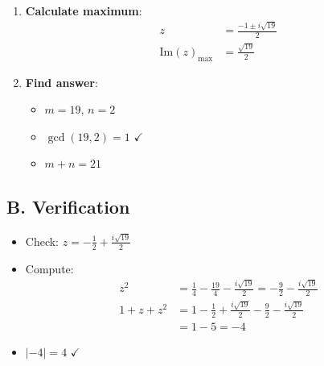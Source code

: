 \documentclass[11pt]{article}
\begin{document}
\begin{solutionbox}
\begin{enumerate}[leftmargin=*]
    \item \textbf{Calculate maximum}:
    \begin{align*}
    z &= \frac{-1 \pm i\sqrt{19}}{2}\\
    \text{Im}(z)_{\max} &= \frac{\sqrt{19}}{2}
    \end{align*}
    
    \item \textbf{Find answer}:
    \begin{itemize}
        \item $m = 19$, $n = 2$
        \item $\gcd(19, 2) = 1$ $\checkmark$
        \item $m + n = 21$
    \end{itemize}
\end{enumerate}

\subsection*{B. Verification}
\begin{itemize}[leftmargin=*]
    \item Check: $z = -\frac{1}{2} + \frac{i\sqrt{19}}{2}$
    \item Compute:
    \begin{align*}
    z^2 &= \frac{1}{4} - \frac{19}{4} - \frac{i\sqrt{19}}{2} = -\frac{9}{2} - \frac{i\sqrt{19}}{2}\\
    1 + z + z^2 &= 1 - \frac{1}{2} + \frac{i\sqrt{19}}{2} - \frac{9}{2} - \frac{i\sqrt{19}}{2}\\
    &= 1 - 5 = -4
    \end{align*}
    \item $|-4| = 4$ $\checkmark$
\end{itemize}
\end{solutionbox}
\end{document}
